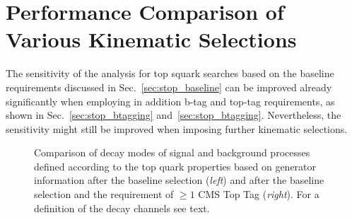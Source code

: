 \section{Performance Comparison of Various Kinematic Selections}
\label{sec:stop_cuts}
The sensitivity of the analysis for top squark searches based on the baseline requirements discussed in Sec.~\ref{sec:stop_baseline} can be improved already significantly when employing in addition b-tag and top-tag requirements, as shown in Sec.~\ref{sec:stop_btagging} and~\ref{sec:stop_btagging}. Nevertheless, the sensitivity might still be improved when imposing further kinematic selections. \\
\begin{figure}[!t]
  \centering
{}
  \caption{Comparison of decay modes of signal and background processes defined according to the top quark properties based on generator information after the baseline selection (\textit{left}) and after the baseline selection and the requirement of $\ge 1$ CMS Top Tag (\textit{right}). For a definition of the decay channels see text.}
  \label{fig:stop_top_channels}
\end{figure} 
